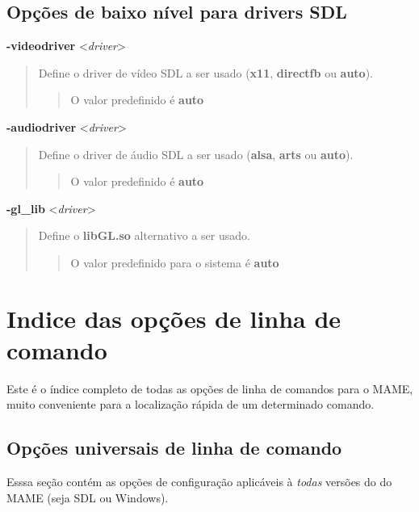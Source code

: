 \documentclass[letterpaper,10pt,brazil]{sphinxmanual}
\begin{document}
\subsection{Opções de baixo nível para drivers SDL}
\label{commandline/sdlconfig:opcoes-de-baixo-nivel-para-drivers-sdl}\label{commandline/sdlconfig:mame-scommandline-videodriver}
\textbf{-videodriver} \textless{}\emph{driver}\textgreater{}
\begin{quote}

Define o driver de vídeo SDL a ser usado (\textbf{x11}, \textbf{directfb} ou
\textbf{auto}).
\begin{quote}

O valor predefinido é \textbf{auto}
\end{quote}
\end{quote}
\label{commandline/sdlconfig:mame-scommandline-audiodriver}
\textbf{-audiodriver} \textless{}\emph{driver}\textgreater{}
\begin{quote}

Define o driver de áudio SDL a ser usado (\textbf{alsa}, \textbf{arts} ou
\textbf{auto}).
\begin{quote}

O valor predefinido é \textbf{auto}
\end{quote}
\end{quote}
\label{commandline/sdlconfig:mame-scommandline-gllib}
\textbf{-gl\_lib} \textless{}\emph{driver}\textgreater{}
\begin{quote}

Define o \textbf{libGL.so} alternativo a ser usado.
\begin{quote}

O valor predefinido para o sistema é \textbf{auto}
\end{quote}
\end{quote}


\section{Indice das opções de linha de comando}
\label{commandline/commandline-index::doc}\label{commandline/commandline-index:indice-das-opcoes-de-linha-de-comando}\label{commandline/commandline-index:index-commandline}
Este é o índice completo de todas as opções de linha de comandos para o
MAME, muito conveniente para a localização rápida de um determinado
comando.


\subsection{Opções universais de linha de comando}
\label{commandline/commandline-index:opcoes-universais-de-linha-de-comando}
Esssa seção contém as opções de configuração aplicáveis à \emph{todas} versões do do MAME (seja SDL ou Windows).
\end{document}
